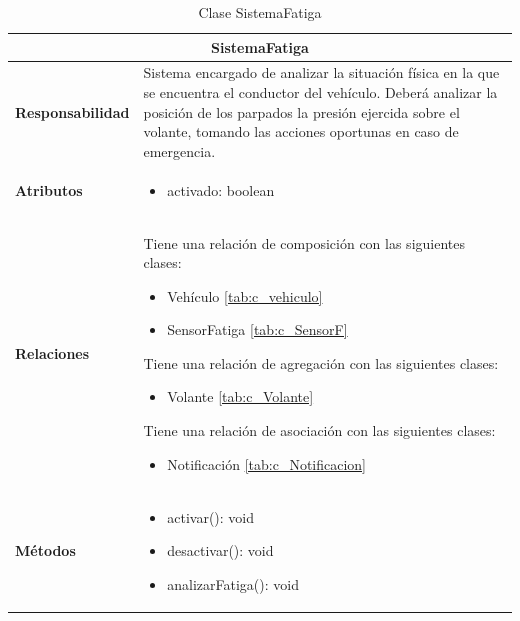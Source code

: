 \begin{table}[H]
\begin{center}
\begin{tabular}{p{} p{11cm}}
\multicolumn{2}{c}{\textbf{SistemaFatiga} } \\ \hline \hline
\textbf{Responsabilidad} &  Sistema encargado de analizar la situación física en la que se encuentra el conductor del vehículo. Deberá analizar la posición de los parpados la presión ejercida sobre el volante, tomando las acciones oportunas en caso de emergencia.  \\ \hline
\textbf{Atributos} & \begin{itemize}
                      \item activado: boolean
                    \end{itemize}\\ \hline
\textbf{Relaciones} & \par Tiene una relación de composición con las siguientes clases:
                      \begin{itemize}
                        \item Vehículo \ref{tab:c_vehiculo}
                        \item SensorFatiga \ref{tab:c_SensorF}
                      \end{itemize}

                      \par Tiene una relación de agregación con las siguientes clases:
                      \begin{itemize}
                        \item Volante \ref{tab:c_Volante}
                      \end{itemize}

                      \par Tiene una relación de asociación con las siguientes clases:
                      \begin{itemize}
                        \item Notificación \ref{tab:c_Notificacion}
                      \end{itemize}


                      \\ \hline

\textbf{Métodos} &  \begin{itemize}
                      \item activar(): void
                      \item desactivar(): void
                      \item analizarFatiga(): void
                    \end{itemize}\\ \hline
\end{tabular}
\caption{Clase SistemaFatiga}
\label{tab:c_SFatiga}
\end{center}
\end{table}











